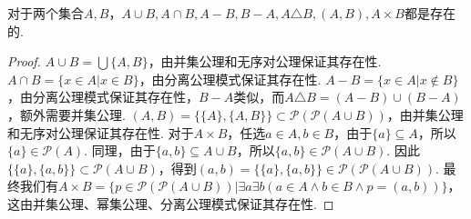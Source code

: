 \begin{theorem}{}
    对于两个集合\(A,B\)，\(A \cup B, A \cap B, A-B, B-A, A \triangle B, (A,B), A \times B\)都是存在的.
\end{theorem}
\begin{proof}
    \(A \cup B = \bigcup\{A,B\}\)，由并集公理和无序对公理保证其存在性.
    \newline
    \(A \cap B = \{x \in A|x \in B\}\)，由分离公理模式保证其存在性.
    \newline
    \(A-B = \{x \in A | x \not \in B\}\)，由分离公理模式保证其存在性，\(B-A\)类似，而\(A \triangle B = (A-B) \cup (B-A)\)，额外需要并集公理.
    \newline
    \((A,B) = \{\{A\},\{A,B\}\} \subset \mathcal{P}(\mathcal{P}(A \cup B))\)，由并集公理和无序对公理保证其存在性.
    \newline
    对于\(A \times B\)，任选\(a \in A, b \in B\)，由于\(\{a\} \subseteq A\)，所以\(\{a\} \in \mathcal{P}(A)\). 同理，由于\(\{a,b\} \subseteq A\cup B\)，所以\(\{a,b\} \in \mathcal{P}(A \cup B)\). 因此\(\{\{a\},\{a,b\}\} \subset \mathcal{P}(A \cup B)\)，得到\((a,b) = \{\{a\},\{a,b\}\} \in \mathcal{P}(\mathcal{P}(A \cup B))\). 最终我们有\(A \times B = \{p\in \mathcal{P}(\mathcal{P}(A \cup B))|\exists a \exists b(a \in A \wedge b \in B \wedge p = (a,b))\}\)，这由并集公理、幂集公理、分离公理模式保证其存在性.
\end{proof}



